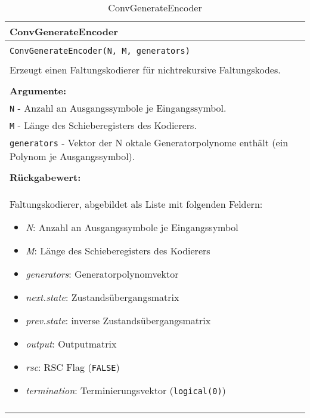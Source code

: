 \begin{longtable}{|p{\textwidth}|}
\hline
\rowcolor{lightblue}
ConvGenerateEncoder
\\
\hline
\\
\texttt{ConvGenerateEncoder(N, M, generators)}\\
\\
Erzeugt einen Faltungskodierer für nichtrekursive Faltungskodes.\\
\\
\textbf{Argumente:}\\
\texttt{N} - Anzahl an Ausgangssymbole je Eingangssymbol.\\
\texttt{M} - Länge des Schieberegisters des Kodierers.\\
\texttt{generators} - Vektor der N oktale Generatorpolynome enthält (ein Polynom je Ausgangssymbol).\\
\\
\textbf{Rückgabewert:}\\
Faltungskodierer, abgebildet als Liste mit folgenden Feldern:
\vspace{-4mm}
\begin{itemize}
\renewcommand\labelitemi{--}
\itemsep-.5em %
\item \emph{N}: Anzahl an Ausgangssymbole je Eingangssymbol
\item \emph{M}: Länge des Schieberegisters des Kodierers
\item \emph{generators}: Generatorpolynomvektor
\item \emph{next.state}: Zustandsübergangsmatrix
\item \emph{prev.state}: inverse Zustandsübergangsmatrix
\item \emph{output}: Outputmatrix
\item \emph{rsc}: RSC Flag (\texttt{FALSE})
\item \emph{termination}: Terminierungsvektor (\texttt{logical(0)})
\end{itemize}
\\
\hline
\caption{ConvGenerateEncoder}
\end{longtable}